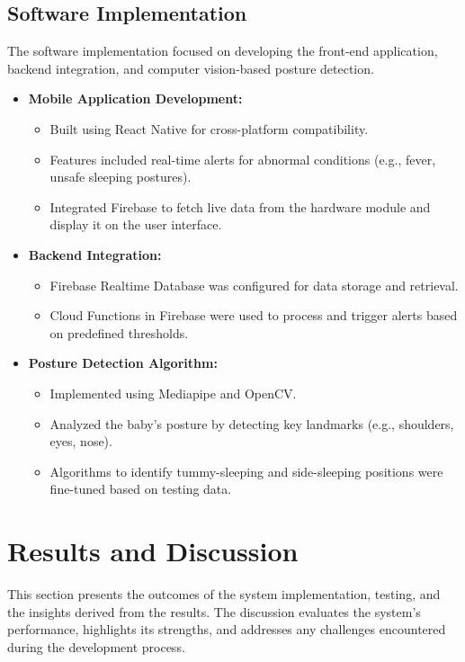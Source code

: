 \documentclass[conference]{IEEEtran}
\begin{document}
\subsection{Software Implementation}
The software implementation focused on developing the front-end application, backend integration, and computer vision-based posture detection.
\begin{itemize}
  \item \textbf{Mobile Application Development:}
   \begin{itemize}
    \item Built using React Native for cross-platform compatibility.
    \item Features included real-time alerts for abnormal conditions (e.g., fever, unsafe sleeping postures).
    \item Integrated Firebase to fetch live data from the hardware module and display it on the user interface.
  \end{itemize}
  \item \textbf{Backend Integration:}
  \begin{itemize}
    \item Firebase Realtime Database was configured for data storage and retrieval.
    \item Cloud Functions in Firebase were used to process and trigger alerts based on predefined thresholds.
  \end{itemize}
  \item \textbf{Posture Detection Algorithm:}
  \begin{itemize}
    \item Implemented using Mediapipe and OpenCV.
    \item Analyzed the baby's posture by detecting key landmarks (e.g., shoulders, eyes, nose).
    \item Algorithms to identify tummy-sleeping and side-sleeping positions were fine-tuned based on testing data.
  \end{itemize}
\end{itemize}



\section{Results and Discussion}

This section presents the outcomes of the system implementation, testing, and the insights derived from the results. The discussion evaluates the system's performance, highlights its strengths, and addresses any challenges encountered during the development process.
\end{document}
